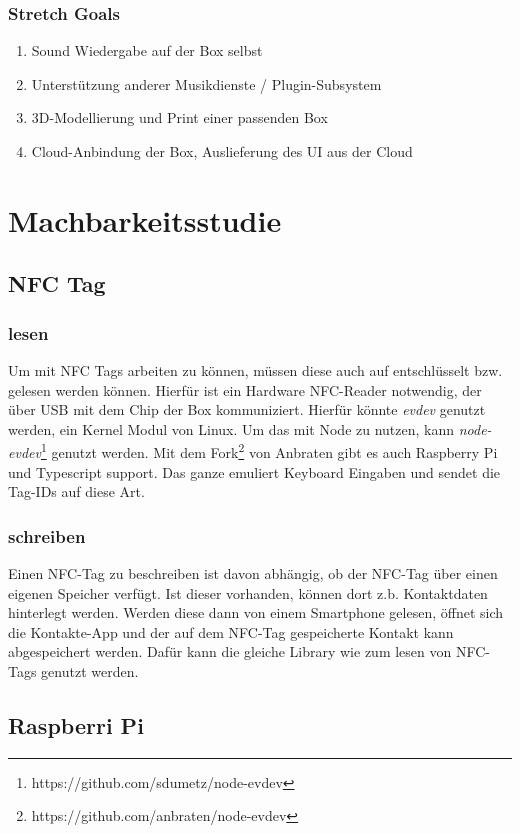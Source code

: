 \documentclass[10pt, a4paper, draft]{article}
\begin{document}
\subsubsection{Stretch Goals}
\begin{enumerate}
  \item Sound Wiedergabe auf der Box selbst
  \item Unterstützung anderer Musikdienste / Plugin-Subsystem
  \item 3D-Modellierung und Print einer passenden Box
  \item Cloud-Anbindung der Box, Auslieferung des UI aus der Cloud
\end{enumerate}

\section{Machbarkeitsstudie}

\subsection{NFC Tag}
\subsubsection{lesen}
Um mit NFC Tags arbeiten zu können, müssen diese auch auf entschlüsselt bzw. gelesen werden können.
Hierfür ist ein Hardware NFC-Reader notwendig, der über USB mit dem Chip der Box kommuniziert.
Hierfür könnte \textit{evdev} genutzt werden, ein Kernel Modul von Linux. Um das mit Node zu nutzen, kann \textit{node-evdev}\footnote{https://github.com/sdumetz/node-evdev} genutzt werden. Mit dem Fork\footnote{https://github.com/anbraten/node-evdev} von Anbraten gibt es auch Raspberry Pi und Typescript support.
Das ganze emuliert Keyboard Eingaben und sendet die Tag-IDs auf diese Art.

\subsubsection{schreiben}
Einen NFC-Tag zu beschreiben ist davon abhängig, ob der NFC-Tag über einen eigenen Speicher verfügt.
Ist dieser vorhanden, können dort z.b. Kontaktdaten hinterlegt werden. Werden diese dann von einem Smartphone gelesen, öffnet sich die Kontakte-App und der auf dem NFC-Tag gespeicherte Kontakt kann abgespeichert werden.
Dafür kann die gleiche Library wie zum lesen von NFC-Tags genutzt werden.

\subsection{Raspberri Pi}
\end{document}
